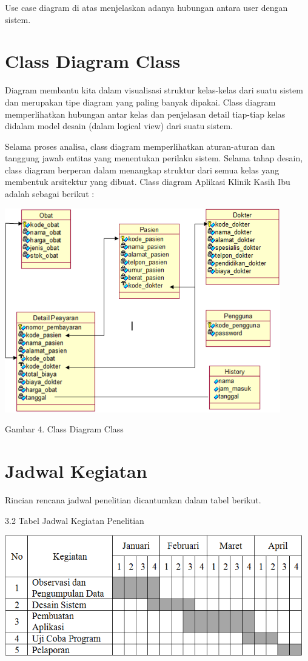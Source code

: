 \documentclass{jtetiproposalskripsi}
\begin{document}
Use case diagram di atas menjelaskan adanya hubungan antara user dengan sistem.


\section{Class Diagram Class}
Diagram membantu kita dalam visualisasi struktur kelas-kelas dari suatu sistem dan merupakan tipe diagram yang paling banyak dipakai. Class diagram memperlihatkan hubungan antar kelas dan penjelasan detail tiap-tiap kelas didalam model desain (dalam logical view) dari suatu sistem. 

Selama proses analisa, class diagram memperlihatkan aturan-aturan dan tanggung jawab entitas yang menentukan perilaku sistem. Selama tahap desain, class diagram berperan dalam menangkap struktur dari semua kelas yang membentuk arsitektur yang dibuat. Class diagram Aplikasi Klinik Kasih Ibu adalah sebagai berikut :

\begin{center}
\includegraphics[width=12cm]{gambar/ClassDiagram.png} 

Gambar 4. Class Diagram Class
\end{center}

\section{Jadwal Kegiatan}
Rincian rencana jadwal penelitian dicantumkan dalam tabel berikut.

3.2 Tabel Jadwal Kegiatan Penelitian

\begin{center}
\includegraphics[width=13cm]{gambar/jadwal.png} 
\end{center}
\end{document}
